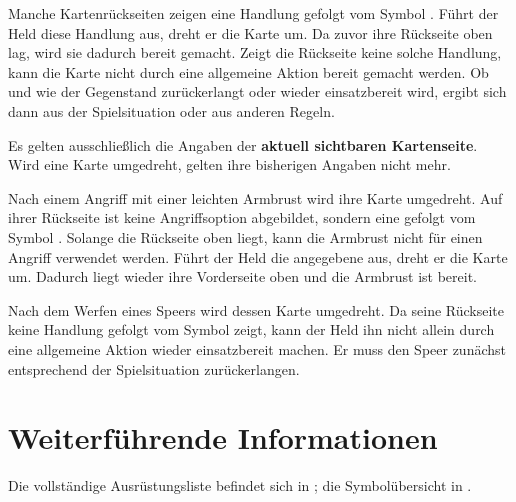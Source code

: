 Manche Kartenrückseiten zeigen eine Handlung gefolgt vom Symbol \exhaust{}. Führt der Held diese Handlung aus, dreht er die Karte um. Da zuvor ihre Rückseite oben lag, wird sie dadurch bereit gemacht. Zeigt die Rückseite keine solche Handlung, kann die Karte nicht durch eine allgemeine Aktion bereit gemacht werden. Ob und wie der Gegenstand zurückerlangt oder wieder einsatzbereit wird, ergibt sich dann aus der Spielsituation oder aus anderen Regeln.

\begin{kurzregel}[title=Nur die sichtbare Seite gilt]
Es gelten ausschließlich die Angaben der \textbf{aktuell sichtbaren Kartenseite}. Wird eine Karte umgedreht, gelten ihre bisherigen Angaben nicht mehr.
\end{kurzregel}

\begin{beispiel}[title=Beispiel: Eine Armbrust bereit machen]
Nach einem Angriff mit einer leichten Armbrust wird ihre Karte umgedreht. Auf ihrer Rückseite ist keine Angriffsoption abgebildet, sondern eine \moveAction{} gefolgt vom Symbol \exhaust{}. Solange die Rückseite oben liegt, kann die Armbrust nicht für einen Angriff verwendet werden. Führt der Held die angegebene \moveAction{} aus, dreht er die Karte um. Dadurch liegt wieder ihre Vorderseite oben und die Armbrust ist bereit.
\end{beispiel}

\begin{beispiel}[title=Beispiel: Eine geworfene Waffe]
Nach dem Werfen eines Speers wird dessen Karte umgedreht. Da seine Rückseite keine Handlung gefolgt vom Symbol \exhaust{} zeigt, kann der Held ihn nicht allein durch eine allgemeine Aktion wieder einsatzbereit machen. Er muss den Speer zunächst entsprechend der Spielsituation zurückerlangen.
\end{beispiel}

\section{Weiterführende Informationen}

Die vollständige Ausrüstungsliste befindet sich in ; die Symbolübersicht in .
